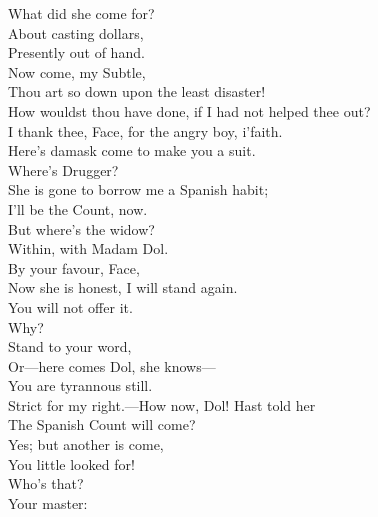 \documentclass[a4paper,oneside,12pt]{memoir}
\begin{document}
\begin{drama*}
\facespeaks What did she come for?\\
\subtlespeaks {} About casting dollars,\\
Presently out of hand.\\
\facespeaks {} Now come, my Subtle,\\
Thou art so down upon the least disaster!\\
How wouldst thou have done, if I had not helped thee out?\\
\subtlespeaks I thank thee, Face, for the angry boy, i'faith.\\
\facespeaks Here's damask come to make you a suit.\\
\subtlespeaks {} Where's Drugger?\\
\facespeaks She is gone to borrow me a Spanish habit;\\
I'll be the Count, now.\\
\subtlespeaks {} But where's the widow?\\
\facespeaks Within, with Madam Dol.\\
\subtlespeaks {} By your favour, Face,\\
Now she is honest, I will stand again.\\
\facespeaks You will not offer it.\\
\subtlespeaks {} Why?\\
\facespeaks {} Stand to your word,\\
Or---here comes Dol, she knows---\\
\subtlespeaks {} You are tyrannous still.\\
\facespeaks Strict for my right.---How now, Dol! Hast told her\\
The Spanish Count will come?\\
\dolspeaks {} Yes; but another is come,\\
You little looked for!\\
\facespeaks {} Who's that?\\
\dolspeaks {} Your master:\\

\end{drama*}
\end{document}
